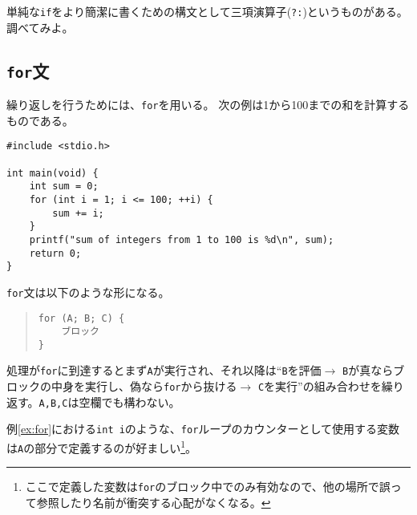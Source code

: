 単純な\texttt{if}をより簡潔に書くための構文として三項演算子(\texttt{?:})というものがある。調べてみよ。

\subsection{\texttt{for}文}
繰り返しを行うためには、\texttt{for}を用いる。
次の例は1から100までの和を計算するものである。
\begin{reidai}\label{ex:for}
\begin{verbatim}
#include <stdio.h>

int main(void) {
    int sum = 0;
    for (int i = 1; i <= 100; ++i) {
        sum += i;
    }
    printf("sum of integers from 1 to 100 is %d\n", sum);
    return 0;
}
\end{verbatim}
\end{reidai} \noindent
\texttt{for}文は以下のような形になる。
\begin{quote}
\begin{verbatim}
for (A; B; C) {
    ブロック
}
\end{verbatim}
\end{quote}
処理が\texttt{for}に到達するとまず\texttt{A}が実行され、それ以降は``\texttt{B}を評価\(\rightarrow\) \texttt{B}が真ならブロックの中身を実行し、偽なら\texttt{for}から抜ける\(\rightarrow\) \texttt{C}を実行''の組み合わせを繰り返す。\texttt{A,B,C}は空欄でも構わない。

例\ref{ex:for}における\texttt{int i}のような、\texttt{for}ループのカウンターとして使用する変数は\texttt{A}の部分で定義するのが好ましい\footnote{ここで定義した変数は\texttt{for}のブロック中でのみ有効なので、他の場所で誤って参照したり名前が衝突する心配がなくなる。}。

